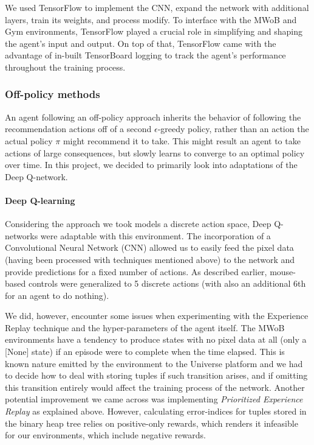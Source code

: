 \documentclass[10pt,journal,compsoc]{IEEEtran}
\begin{document}
We used TensorFlow to implement the CNN, expand the network with additional layers, train its weights, and process modify. To interface with the MWoB and Gym environments, TensorFlow played a crucial role in simplifying and shaping the agent's input and output. On top of that, TensorFlow came with the advantage of in-built TensorBoard logging to track the agent's performance throughout the training process.

\subsubsection{Off-policy methods}  
An agent following an off-policy approach inherits the behavior of following the recommendation actions off of a second \(\epsilon\)-greedy policy, rather than an action the actual policy \(\pi\) might recommend it to take. This might result an agent to take actions of large consequences, but slowly learns to converge to an optimal policy over time. In this project, we decided to primarily look into adaptations of the Deep Q-network.\linebreak

\paragraph{\bf Deep Q-learning}
Considering the approach we took models a discrete action space, Deep Q-networks were adaptable with this environment. The incorporation of a Convolutional Neural Network (CNN) allowed us to easily feed the pixel data (having been processed with techniques mentioned above) to the network and provide predictions for a fixed number of actions. As described earlier, mouse-based controls were generalized to 5 discrete actions (with also an additional 6th for an agent to do nothing).\linebreak

We did, however, encounter some issues when experimenting with the Experience Replay technique and the hyper-parameters of the agent itself. The MWoB environments have a tendency to produce states with no pixel data at all (only a [None] state) if an episode were to complete when the time elapsed. This is known nature emitted by the environment to the Universe platform and we had to decide how to deal with storing tuples if such transition arises, and if omitting this transition entirely would affect the training process of the network. Another potential improvement we came across was implementing \textit{Prioritized Experience Replay} as explained above. However, calculating error-indices for tuples stored in the binary heap tree relies on positive-only rewards, which renders it infeasible for our environments, which include negative rewards.
\end{document}
